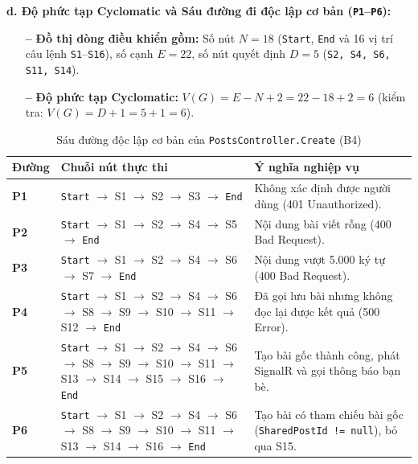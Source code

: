 \documentclass[11pt,a4paper]{article}
\begin{document}
\noindent\textbf{d. Độ phức tạp Cyclomatic và Sáu đường đi độc lập cơ bản (\texttt{P1}--\texttt{P6}):}
\begin{itemize}[leftmargin=1.2cm, noitemsep]
    \item[\textbf{--}] \textbf{Đồ thị dòng điều khiển gồm:} Số nút $N = 18$ (\texttt{Start}, \texttt{End} và 16 vị trí câu lệnh \texttt{S1}--\texttt{S16}), số cạnh $E = 22$, số nút quyết định $D = 5$ (\texttt{S2, S4, S6, S11, S14}).
    \item[\textbf{--}] \textbf{Độ phức tạp Cyclomatic:} $V(G) = E - N + 2 = 22 - 18 + 2 = 6$ (kiểm tra: $V(G) = D + 1 = 5 + 1 = 6$).
\end{itemize}
\begin{table}[H]
\centering
\small
\begin{tabularx}{\textwidth}{|C{1.3cm}|L{7.8cm}|X|}
\hline
{}
\textbf{Đường} & \textbf{Chuỗi nút thực thi} & \textbf{Ý nghĩa nghiệp vụ} \tabularnewline
\hline
\textbf{P1} & \texttt{Start} $\rightarrow$ S1 $\rightarrow$ S2 $\rightarrow$ S3 $\rightarrow$ \texttt{End} & Không xác định được người dùng (401 Unauthorized). \\ \hline
\textbf{P2} & \texttt{Start} $\rightarrow$ S1 $\rightarrow$ S2 $\rightarrow$ S4 $\rightarrow$ S5 $\rightarrow$ \texttt{End} & Nội dung bài viết rỗng (400 Bad Request). \\ \hline
\textbf{P3} & \texttt{Start} $\rightarrow$ S1 $\rightarrow$ S2 $\rightarrow$ S4 $\rightarrow$ S6 $\rightarrow$ S7 $\rightarrow$ \texttt{End} & Nội dung vượt 5.000 ký tự (400 Bad Request). \\ \hline
\textbf{P4} & \texttt{Start} $\rightarrow$ S1 $\rightarrow$ S2 $\rightarrow$ S4 $\rightarrow$ S6 $\rightarrow$ S8 $\rightarrow$ S9 $\rightarrow$ S10 $\rightarrow$ S11 $\rightarrow$ S12 $\rightarrow$ \texttt{End} & Đã gọi lưu bài nhưng không đọc lại được kết quả (500 Error). \\ \hline
\textbf{P5} & \texttt{Start} $\rightarrow$ S1 $\rightarrow$ S2 $\rightarrow$ S4 $\rightarrow$ S6 $\rightarrow$ S8 $\rightarrow$ S9 $\rightarrow$ S10 $\rightarrow$ S11 $\rightarrow$ S13 $\rightarrow$ S14 $\rightarrow$ S15 $\rightarrow$ S16 $\rightarrow$ \texttt{End} & Tạo bài gốc thành công, phát SignalR và gọi thông báo bạn bè. \\ \hline
\textbf{P6} & \texttt{Start} $\rightarrow$ S1 $\rightarrow$ S2 $\rightarrow$ S4 $\rightarrow$ S6 $\rightarrow$ S8 $\rightarrow$ S9 $\rightarrow$ S10 $\rightarrow$ S11 $\rightarrow$ S13 $\rightarrow$ S14 $\rightarrow$ S16 $\rightarrow$ \texttt{End} & Tạo bài có tham chiếu bài gốc (\texttt{SharedPostId != null}), bỏ qua S15. \\ \hline
\end{tabularx}
\caption{Sáu đường độc lập cơ bản của \texttt{PostsController.Create} (B4)}
\end{table}
\end{document}
